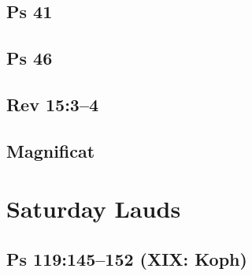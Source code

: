 \subsection{Ps 41}

{%
\parindent 0pt
\noindent
\ifx\preLilyPondExample \undefined
\else
  \expandafter\preLilyPondExample
\fi
\def\lilypondbook{}%

\ifx\postLilyPondExample \undefined
\else
  \expandafter\postLilyPondExample
\fi
}

\subsection{Ps 46}

{%
\parindent 0pt
\noindent
\ifx\preLilyPondExample \undefined
\else
  \expandafter\preLilyPondExample
\fi
\def\lilypondbook{}%

\ifx\postLilyPondExample \undefined
\else
  \expandafter\postLilyPondExample
\fi
}

\subsection{Rev 15:3--4}

{%
\parindent 0pt
\noindent
\ifx\preLilyPondExample \undefined
\else
  \expandafter\preLilyPondExample
\fi
\def\lilypondbook{}%

\ifx\postLilyPondExample \undefined
\else
  \expandafter\postLilyPondExample
\fi
}

\subsection{Magnificat}

{%
\parindent 0pt
\noindent
\ifx\preLilyPondExample \undefined
\else
  \expandafter\preLilyPondExample
\fi
\def\lilypondbook{}%

\ifx\postLilyPondExample \undefined
\else
  \expandafter\postLilyPondExample
\fi
}


\section{Saturday Lauds}

\subsection{Ps 119:145--152 (XIX: Koph)}

{%
\parindent 0pt
\noindent
\ifx\preLilyPondExample \undefined
\else
  \expandafter\preLilyPondExample
\fi
\def\lilypondbook{}%

\ifx\postLilyPondExample \undefined
\else
  \expandafter\postLilyPondExample
\fi
}

